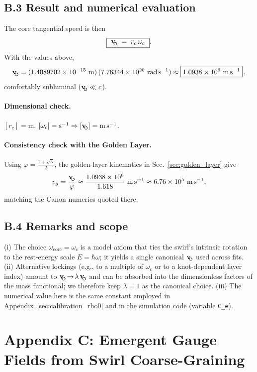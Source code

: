 \documentclass[11pt, preprint,titlepage]{revtex4-2}
\newcommand{\swirlarrow}{\!\!\scriptsize\boldsymbol{\circlearrowleft}}
\newcommand{\vswirl}{\mathbf{v}_{\swirlarrow}}
\begin{document}
	\subsection*{B.3 Result and numerical evaluation}
	The core tangential speed is then
	\[
		\boxed{\ \vswirl \;=\; r_c\,\omega_c\ } .
	\]
	With the values above,
	\[
		\vswirl
		= (1.4089702\times10^{-15}\ \mathrm{m})\,(7.76344\times10^{20}\ \mathrm{rad\,s^{-1}})
		\approx \boxed{1.0938\times10^{6}\ \mathrm{m\,s^{-1}}}\,,
	\]
	comfortably subluminal (\(\vswirl\ll c\)).

	\paragraph{Dimensional check.}
	\([r_c]=\mathrm{m}\), \([\omega_c]=\mathrm{s^{-1}}\Rightarrow [\vswirl]=\mathrm{m\,s^{-1}}\).

	\paragraph{Consistency check with the Golden Layer.}
	Using \(\varphi=\tfrac{1+\sqrt5}{2}\), the golden-layer kinematics in Sec.~\ref{sec:golden_layer} give
	\[
		v_g=\frac{\vswirl}{\varphi}\approx \frac{1.0938\times10^6}{1.618}\ \mathrm{m\,s^{-1}}
		\approx 6.76\times10^5\ \mathrm{m\,s^{-1}},
	\]
	matching the Canon numerics quoted there.

	\subsection*{B.4 Remarks and scope}
	(i) The choice \(\omega_{\text{core}}=\omega_c\) is a model axiom that ties the swirl’s intrinsic rotation to the rest-energy scale \(E=\hbar\omega\); it yields a single canonical \(\vswirl\) used across fits.
	(ii) Alternative lockings (e.g., to a multiple of \(\omega_c\) or to a knot-dependent layer index) amount to \(\vswirl\!\to\! \lambda\,\vswirl\) and can be absorbed into the dimensionless factors of the mass functional; we therefore keep \(\lambda=1\) as the canonical choice.
	(iii) The numerical value here is the same constant employed in Appendix~\ref{sec:calibration_rho0} and in the simulation code (variable \texttt{C\_e}).

	\section*{Appendix C: Emergent Gauge Fields from Swirl Coarse-Graining}
		\label{sec:swirl-connection}
\end{document}
